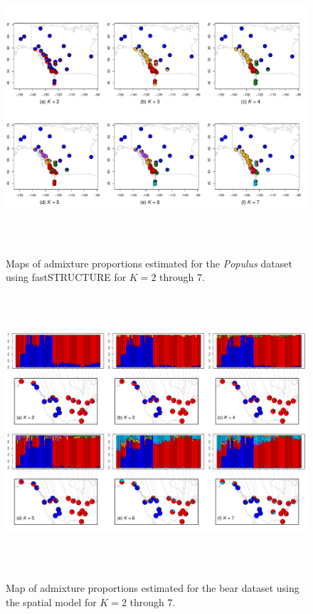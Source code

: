 \documentclass[12pt]{article}
\begin{document}
\begin{figure}
	\centering
		{\includegraphics[width=6in,height=4in]{figs/populus/poplar_fastStr_results.pdf}}
	\caption{
	Maps of admixture proportions estimated for the \textit{Populus} dataset 
	using fastSTRUCTURE \citep{fastStructure} for $K=2$ through 7.
    }\label{populus_fastStr}
\end{figure}

\begin{figure}
	\centering
		{\includegraphics[width=6in,height=4in]{figs/bears/bear_sp_results.pdf}}
	\caption{
	Map of admixture proportions estimated for the bear dataset 
	using the spatial model for $K=2$ through 7.
    }\label{bear_sp_pies}
\end{figure}
\end{document}
